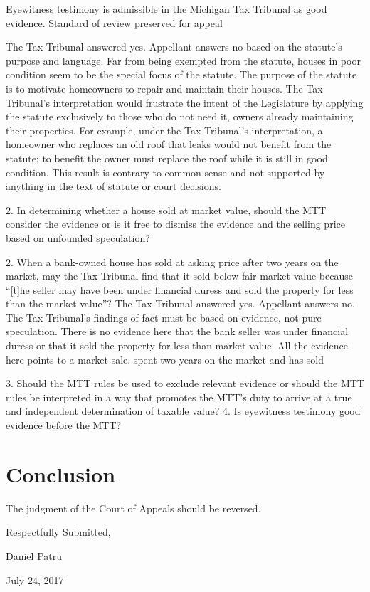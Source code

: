 \documentclass[12pt,\documentclassflag]{michiganCourtOfAppealsBrief}
\begin{document}
 
Eyewitness testimony is admissible in the Michigan Tax Tribunal as good evidence.
Standard of review
preserved for appeal
 
The Tax Tribunal answered yes. Appellant answers no based on the statute's purpose and language. Far from being exempted from the statute, houses in poor condition seem to be the special focus of the statute. The purpose of the statute is to motivate homeowners to repair and maintain their houses. The Tax Tribunal's interpretation would frustrate the intent of the Legislature by applying the statute exclusively to those who do not need it, owners already maintaining their properties. For example, under the Tax Tribunal's interpretation, a homeowner who replaces an old roof that leaks would not benefit from the statute; to benefit the owner must replace the roof while it is still in good condition. This result is contrary to common sense and not supported by anything in the text of statute or court decisions.
 
2. In determining whether a house sold at market value, should the MTT consider the evidence or is it free to dismiss the evidence and the selling price based on unfounded speculation?
 
2. When a bank-owned house has sold at asking price after two years on the market, may the Tax Tribunal find that it sold below fair market value because ``[t]he seller may have been under financial duress and sold the property for less than the market value''?
The Tax Tribunal answered yes. Appellant answers no. The Tax Tribunal's findings of fact must be based on evidence, not pure speculation. There is no evidence here that the bank seller was under financial duress or that it sold the property for less than market value. All the evidence here points to a market sale.
spent two years on the market and has sold
 
3. Should the MTT rules be used to exclude relevant evidence or should the MTT rules be interpreted in a way that promotes the MTT's duty to arrive at a true and independent determination of taxable value?
4. Is eyewitness testimony good evidence before the MTT?
 
 
 
 
\section{Conclusion}

 

 
The judgment of the Court of Appeals should be reversed.

\vspace{1\baselineskip}

{ \setlength{\leftskip}{3.5in}

  Respectfully Submitted,

  Daniel Patru

  July 24, 2017

  \setlength{\leftskip}{0pt}}
\end{document}
